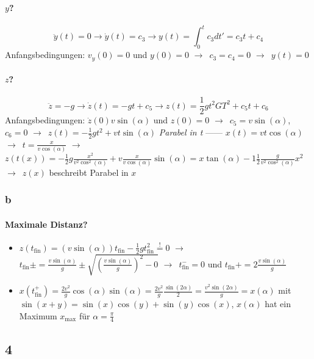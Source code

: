 \documentclass[oneside]{book}
\theoremstyle{definition}
\newcommand{\conseq}{$\rightarrow$~}
\newcommand{\tfin}{t_\text{fin}}
\begin{document}
\paragraph{$y$?}
$$\ddot{y}(t) = 0 \rightarrow \dot{y}(t) = c_3 \rightarrow y(t) = \int_0^t c_3 d t' = c_3 t + c_4$$
Anfangsbedingungen: $v_y(0) = 0$ und $y(0) = 0$ \conseq $c_3 = c_4 = 0$ \conseq $y(t) = 0$

\paragraph{$z$?}
$$\ddot{z} = -g \rightarrow \dot{z}(t) = - gt + c_5 \rightarrow z(t) = \frac{1}{2} g t^2 GT^2 + c_5 t +c_6$$
Anfangsbedingungen: $\dot{z}(0) v \sin(\alpha)$ und $z(0) = 0$ \conseq $c_5 = v \sin(\alpha)$, $c_6 = 0$ \conseq $z(t) = - \frac{1}{2} g t^2 + v t \sin(\alpha)$ \textit{Parabel in t}
------
$x(t) = v t \cos(\alpha)$ \conseq $t = \frac{x}{v \cos(\alpha)}$ \conseq $z(t(x)) = - \frac{1}{2} g \frac{x^2}{v^2 \cos^2(\alpha)} + v \frac{x}{v \cos(\alpha)} \sin(\alpha) = x\tan(\alpha) - 1 \frac{1}{2} \frac{g}{v^2 \cos^2(\alpha)} x^2$ \conseq $z(x)$ beschreibt Parabel in $x$

\subsubsection{b}

\paragraph{Maximale Distanz?}
\begin{itemize}
	\item $z(\tfin) = (v \sin(\alpha)) \tfin - \frac{1}{2} g \tfin^2 \overset{!}{=} 0$ \conseq $\tfin\pm = \frac{v \sin(\alpha)}{g} \pm \sqrt{(\frac{v \sin(\alpha)}{g})^2 - 0}$ \conseq $\tfin^- = 0$ und $\tfin+ = 2 \frac{v \sin(\alpha)}{g}$
	\item $x(\tfin^+) = \frac{2 v^2}{g} \cos(\alpha) \sin(\alpha) = \frac{2v^2}{g} \frac{\sin(2\alpha)}{2} = \frac{v^2 \sin(2 \alpha)}{g} = x(\alpha)$ mit $\sin(x + y) = \sin(x)\cos(y) + \sin(y)\cos(x)$, $x(\alpha)$ hat ein Maximum $x_\text{max}$ für $\alpha = \frac{\pi}{4}$
\end{itemize} 


\subsection{4}
\end{document}
